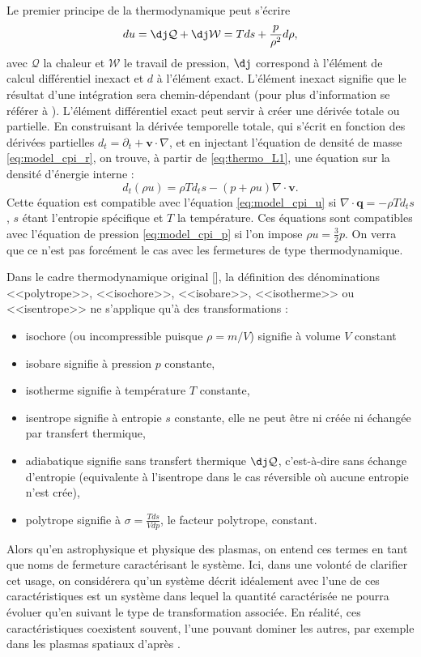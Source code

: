 Le premier principe de la thermodynamique peut s'écrire 
\begin{equation}
\label{eq:thermo_L1} du =  \dj \mathcal{Q} + \dj \mathcal{W} = Tds + \frac{p}{\rho^2} d\rho,
\end{equation}
avec $\mathcal{Q}$ la chaleur et $\mathcal{W}$ le travail de pression, $\dj$ correspond à l'élément de calcul différentiel inexact et $d$ à l'élément exact. L'élément inexact signifie que le résultat d'une intégration sera chemin-dépendant (pour plus d'information se référer à \cite{borel_thermodynamique_2005}). L'élément différentiel exact peut servir à créer une dérivée totale ou partielle. En construisant la dérivée temporelle totale, qui s'écrit en fonction des dérivées partielles $d_t = \partial_t + \boldsymbol{v} \cdot \nabla $, et en injectant l'équation de densité de masse \eqref{eq:model_cpi_r}, on trouve, à partir de \eqref{eq:thermo_L1}, une équation sur la densité d'énergie interne : 
\begin{equation}
\label{eq:thermo_u}   d_t \left(\rho u\right) = \rho T d_t s - \left(p+\rho u\right)\nabla \cdot \boldsymbol{v}.
\end{equation}
Cette équation est compatible avec l'équation \eqref{eq:model_cpi_u} si $\nabla \cdot \mathbf{q} = - \rho T d_t s$, $s$ étant l'entropie spécifique et $T$ la température. Ces équations sont compatibles avec l'équation de pression \eqref{eq:model_cpi_p} si l'on impose $\rho u = \frac{3}{2} p$. On verra que ce n'est pas forcément le cas avec les fermetures de type thermodynamique. 

Dans le cadre thermodynamique original [\cite{borel_thermodynamique_2005}], la définition des dénominations <<polytrope>>, <<isochore>>, <<isobare>>, <<isotherme>> ou <<isentrope>> ne s’applique qu’à des transformations : 
\begin{itemize}
    \item isochore (ou incompressible puisque $\rho = m/V$) signifie à volume $V$ constant
    \item isobare signifie à pression $p$ constante,
    \item isotherme signifie à température $T$ constante, 
    \item isentrope signifie à entropie $s$ constante, elle ne peut être ni créée ni échangée par transfert thermique, 
    \item adiabatique signifie sans transfert thermique $\dj \mathcal{Q}$, c'est-à-dire sans échange d'entropie (equivalente à l'isentrope dans le cas réversible où aucune entropie n'est crée),
    \item polytrope signifie à $\sigma = \frac{Tds}{Vdp}$, le facteur polytrope, constant.
\end{itemize}
Alors qu'en astrophysique et physique des plasmas, on entend ces termes en tant que noms de fermeture caractérisant le système. Ici, dans une volonté de clarifier cet usage, on considérera qu’un système décrit idéalement avec l’une de ces caractéristiques est un système dans lequel la quantité caractérisée ne pourra évoluer qu’en suivant le type de transformation associée. En réalité, ces caractéristiques coexistent souvent, l'une pouvant dominer les autres, par exemple dans les plasmas spatiaux d'après \cite{livadiotis_non-equilibrium_2012}. 


